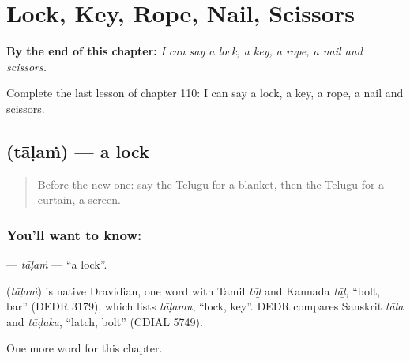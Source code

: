 
\chapter{Lock, Key, Rope, Nail, Scissors}
\label{ch:te-lock-key-rope-nail-scissors}

\begin{chapteropening}
\textbf{By the end of this chapter:} \emph{I can say a lock, a key, a rope, a nail and scissors.}

Complete the last lesson of chapter 110: I can say a lock, a key, a rope, a nail and scissors.
\end{chapteropening}

\section[\texorpdfstring{\te{తాళం} (tāḷaṁ)}{తాళం (tāḷaṁ)}]{ (tāḷaṁ) — a lock}

\label{lesson:TE-C110-talam}



\begin{quote}
Before the new one: say the Telugu for a blanket, then the Telugu for a curtain, a screen.
\end{quote}

\subsection*{You'll want to know: }
\textbf{} — \emph{tāḷaṁ} — \textquotedblleft{}a lock\textquotedblright{}.

\begin{cousinweb}
\textbf{} (\emph{tāḷaṁ}) is native Dravidian, one word with Tamil \emph{tāḻ} and Kannada \emph{tāḻ}, \textquotedblleft{}bolt, bar\textquotedblright{} (DEDR 3179), which lists \emph{tāḷamu}, \textquotedblleft{}lock, key\textquotedblright{}. DEDR compares Sanskrit \emph{tāla} and \emph{tāḍaka}, \textquotedblleft{}latch, bolt\textquotedblright{} (CDIAL 5749).
\end{cousinweb}

\begin{grammarlens}[title={What you've built}]
One more word for this chapter.
\end{grammarlens}

